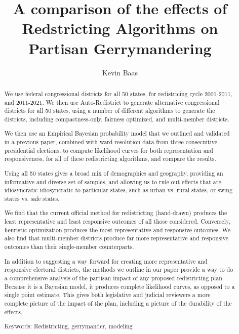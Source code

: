 \documentclass[preprint,12pt]{article}
\begin{document}
\title{A comparison of the effects of Redstricting Algorithms on Partisan Gerrymandering}

\author{Kevin Baas}

\maketitle

\begin{abstract}
We use federal congressional districts for all 50 states, for redistricing cycle 2001-2011, and 2011-2021.  We then use Auto-Redistrict to generate alternative congressional districts for all 50 states, using a number of different algorithms to generate the districts, including compactness-only, fairness optimized, and multi-member districts.

We then use an Empirical Bayesian probability model that we outlined and validated in a previous paper, combined with ward-resolution data from three consecuitive presidential elections, to compute likelihood curves for both representation and responsiveness, for all of these redistricting algorithms, and compare the results.

Using all 50 states gives a broad mix of demographics and geography, providing an informative and diverse set of samples, and allowing us to rule out effects that are idiosyncratic idiosyncratic to particular states, such as urban vs. rural states, or swing states vs. safe states.

We find that the current official method for redistricting (hand-drawn) produces the least representative and least responsive outcomes of all those considered.  Conversely, heuristic optimization produces the most representative and responsive outcomes.  We also find that multi-member districts produce far more representative and responsive outcomes than their single-member counterparts.

In addition to suggesting a way forward for creating more representative and responsive electoral districts, the methods we outline in our paper provide a way to do a comprehensive analysis of the partisan impact of any proposed redistricting plan.  Because it is a Bayesian model, it produces complete likelihood curves, as opposed to a single point estimate.  This gives both legislative and judicial reviewers a more complete picture of the impact of the plan, including a picture of the durability of the effects.

Keywords: Redistricting, gerrymander, modeling

\end{abstract}
\end{document}

